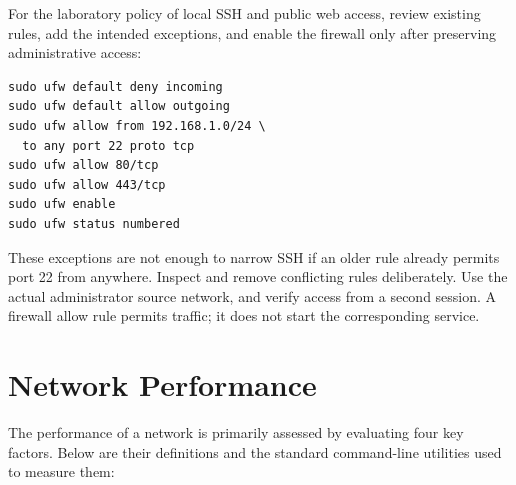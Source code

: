 \documentclass[journal]{IEEEtran}
\begin{document}
For the laboratory policy of local SSH and public web access, review existing rules, add the intended exceptions, and enable the firewall only after preserving administrative access:
\begin{lstlisting}
sudo ufw default deny incoming
sudo ufw default allow outgoing
sudo ufw allow from 192.168.1.0/24 \
  to any port 22 proto tcp
sudo ufw allow 80/tcp
sudo ufw allow 443/tcp
sudo ufw enable
sudo ufw status numbered
\end{lstlisting}
These exceptions are not enough to narrow SSH if an older rule already permits port 22 from anywhere. Inspect and remove conflicting rules deliberately. Use the actual administrator source network, and verify access from a second session. A firewall allow rule permits traffic; it does not start the corresponding service.

\section{Network Performance}

The performance of a network is primarily assessed by evaluating four key factors. Below are their definitions and the standard command-line utilities used to measure them:
\end{document}
